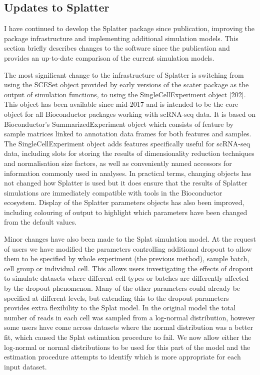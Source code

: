 \documentclass[11pt,a4paper,titlepage,twoside,openright]{style/unimelbthesis}
\theoremstyle{definition}
\theoremstyle{definition}
\theoremstyle{definition}
\theoremstyle{remark}
\begin{document}
\begin{mainmatter}
\hypertarget{splatter-update}{%
\section{Updates to Splatter}\label{splatter-update}}

I have continued to develop the Splatter package since publication, improving the package infrastructure and implementing additional simulation models. This section briefly describes changes to the software since the publication and provides an up-to-date comparison of the current simulation models.

The most significant change to the infrastructure of Splatter is switching from using the SCESet object provided by early versions of the scater package as the output of simulation functions, to using the SingleCellExperiment object {[}202{]}. This object has been available since mid-2017 and is intended to be the core object for all Bioconductor packages working with scRNA-seq data. It is based on Bioconductor's SummarizedExperiment object which consists of feature by sample matrices linked to annotation data frames for both features and samples. The SingleCellExperiment object adds features specifically useful for scRNA-seq data, including slots for storing the results of dimensionality reduction techniques and normalisation size factors, as well as conveniently named accessors for information commonly used in analyses. In practical terms, changing objects has not changed how Splatter is used but it does ensure that the results of Splatter simulations are immediately compatible with tools in the Bioconductor ecosystem. Display of the Splatter parameters objects has also been improved, including colouring of output to highlight which parameters have been changed from the default values.

Minor changes have also been made to the Splat simulation model. At the request of users we have modified the parameters controlling additional dropout to allow them to be specified by whole experiment (the previous method), sample batch, cell group or individual cell. This allows users investigating the effects of dropout to simulate datasets where different cell types or batches are differently affected by the dropout phenomenon. Many of the other parameters could already be specified at different levels, but extending this to the dropout parameters provides extra flexibility to the Splat model. In the original model the total number of reads in each cell was sampled from a log-normal distribution, however some users have come across datasets where the normal distribution was a better fit, which caused the Splat estimation procedure to fail. We now allow either the log-normal or normal distributions to be used for this part of the model and the estimation procedure attempts to identify which is more appropriate for each input dataset.


\end{mainmatter}
\end{document}
